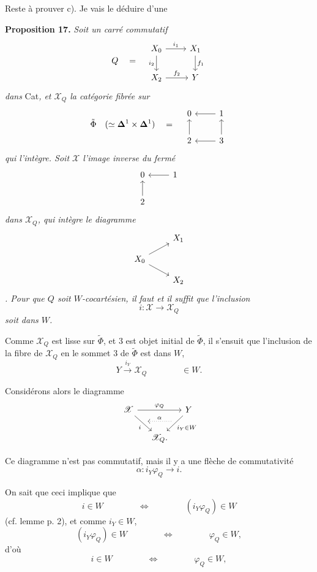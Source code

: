 \documentclass[11pt]{article}
\newcommand{\printedpage}[1]{\marginpar{\footnotesize p.~#1}}
\newcommand{\msp}[1]{\marginpar{\footnotesize [#1]}}
\newcommand{\cX}{\mathscr{X}}
\begin{document}
\printedpage{150}

Reste à prouver c). Je vais le déduire d'une

\textbf{Proposition 17.} \textit{Soit un carré commutatif}
\[
Q \quad = \quad
\begin{tikzcd}
X_0 \arrow[r, "i_1"] \arrow[d, "i_2"'] & X_1 \arrow[d, "f_1"] \\
X_2 \arrow[r, "f_2"] & Y
\end{tikzcd}
\]
\textit{dans} Cat\textit{, et $\cX_Q$ la catégorie fibrée sur}
\[
\tilde{\Phi} \quad (\simeq \mathbf{\Delta}^1 \times \mathbf{\Delta}^1) \quad = \quad
\begin{tikzcd}
0 & 1 \arrow[l] \\
2 \arrow[u] & 3 \arrow[l] \arrow[u]
\end{tikzcd}
\]
\textit{qui l'intègre. Soit $\cX$ l'image inverse du fermé}
\[
\begin{tikzcd}
0 & 1 \arrow[l] \\
2 \arrow[u] &
\end{tikzcd}
\]
\msp{page 235}
\textit{dans $\cX_Q$, qui intègre le diagramme}
\[
\begin{tikzcd}[row sep=small]
 & X_1 \\
X_0 \arrow[ru] \arrow[rd] & \\
 & X_2
\end{tikzcd}
\]
\textit{. Pour que $Q$ soit $W$-cocartésien, il faut et il suffit que l'inclusion}
\[
i : \cX \longrightarrow \cX_Q
\]
\textit{soit dans $W$.}

Comme $\cX_Q$ est lisse sur $\tilde{\Phi}$, et 3 est objet initial de $\tilde{\Phi}$, il s'ensuit que l'inclusion de la fibre de $\cX_Q$ en le sommet 3 de $\tilde{\Phi}$ est dans $W$,
\[
Y \xrightarrow{i_Y} \cX_Q \qquad\qquad \in W.
\]

Considérons alors le diagramme
\[
\begin{tikzcd}[column sep=small]
\cX \arrow[rr, "\varphi_Q"] \arrow[rd, "i"'] & & Y \arrow[ld, "i_Y\in W"] \arrow[ll, dotted, shift left=3ex, shorten <=1.2em, shorten >=1.2em, "\alpha"'] \\
 & \cX_Q. &
\end{tikzcd}
\]

\printedpage{151}

Ce diagramme n'est pas commutatif, mais il y a une flèche de commutativité
\[
\alpha : i_Y\varphi_Q \longrightarrow i.
\]

On sait que ceci implique que
\[
i \in W \qquad\qquad \Longleftrightarrow \qquad\qquad (i_Y\varphi_Q) \in W
\]
(cf. lemme p. 2), et comme $i_Y \in W$,
\[
(i_Y\varphi_Q) \in W \qquad\qquad \Longleftrightarrow \qquad\qquad \varphi_Q \in W,
\]
d'où
\[
i \in W \qquad\qquad \Longleftrightarrow \qquad\qquad \varphi_Q \in W,
\]
\end{document}
